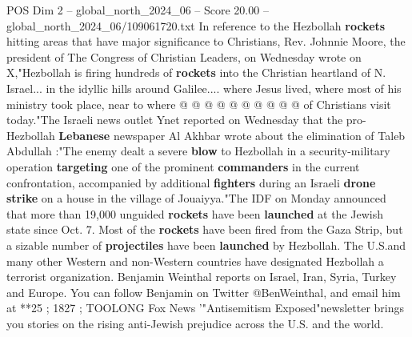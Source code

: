\begin{textsample}{POS Dim 2 – global\_north\_2024\_06 – Score 20.00 – global\_north\_2024\_06/109061720.txt}
In reference to the Hezbollah \textbf{rockets} hitting areas that have major significance to Christians, Rev.
Johnnie Moore, the president of The Congress of Christian Leaders, on Wednesday wrote on X,"Hezbollah is firing hundreds of \textbf{rockets} into the Christian heartland of N.
Israel... in the idyllic hills around Galilee.... where Jesus lived, where most of his ministry took place, near to where @ @ @ @ @ @ @ @ @ @ of Christians visit today."The Israeli news outlet Ynet reported on Wednesday that the pro-Hezbollah \textbf{Lebanese} newspaper Al Akhbar wrote about the elimination of Taleb Abdullah :"The enemy dealt a severe \textbf{blow} to Hezbollah in a security-military operation \textbf{targeting} one of the prominent \textbf{commanders} in the current confrontation, accompanied by additional \textbf{fighters} during an Israeli \textbf{drone} \textbf{strike} on a house in the village of Jouaiyya."The IDF on Monday announced that more than 19,000 unguided \textbf{rockets} have been \textbf{launched} at the Jewish state since Oct. 7.
Most of the \textbf{rockets} have been fired from the Gaza Strip, but a sizable number of \textbf{projectiles} have been \textbf{launched} by Hezbollah.
The U.S.and many other Western and non-Western countries have designated Hezbollah a terrorist organization.
Benjamin Weinthal reports on Israel, Iran, Syria, Turkey and Europe.
You can follow Benjamin on Twitter @BenWeinthal, and email him at **25 ; 1827 ; TOOLONG Fox News '"Antisemitism Exposed"newsletter brings you stories on the rising anti-Jewish prejudice across the U.S. and the world.

\end{textsample}
